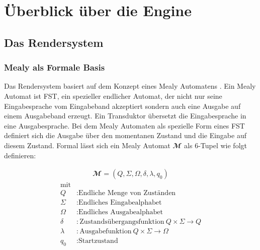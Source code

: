 \chapter{Überblick über die Engine}

\section{Das Rendersystem}


\subsection{Mealy als Formale Basis}

Das Rendersystem basiert auf dem Konzept eines Mealy Automatens \parencite{Mealy1955}. Ein Mealy Automat ist \ac{FST}, ein spezieller endlicher Automat, der nicht nur seine Eingabesprache vom Eingabeband akzeptiert sondern auch eine Ausgabe auf einem Ausgabeband erzeugt. Ein Transduktor übersetzt die Eingabesprache in eine Ausgabesprache. Bei dem Mealy Automaten als spezielle Form eines \ac{FST} definiert sich die Ausgabe über den momentanen Zustand und die Eingabe auf diesem Zustand. Formal lässt sich ein Mealy Automat $\mathbfcal{M}$ als 6-Tupel wie folgt definieren:

\begin{align}
\mathbfcal{M} = \left( Q, \Sigma, \Omega, \delta, \lambda, q_0 \right)
\label{def:mealy-formal}
\end{align}
\begin{align*}
	\text{mit}\\
	Q &: \text{Endliche Menge von Zuständen} \\
	\Sigma  &:\text{Endliches Eingabealphabet} \\
	\Omega  &:\text{Endliches Ausgabealphabet} \\
	\delta  &:\text{Zustandsübergangsfunktion}\ Q \times \Sigma \rightarrow Q \\
	\lambda &:\text{Ausgabefunktion}\ Q \times \Sigma \rightarrow \Omega \\
	q_0 &: \text{Startzustand}
\end{align*}

